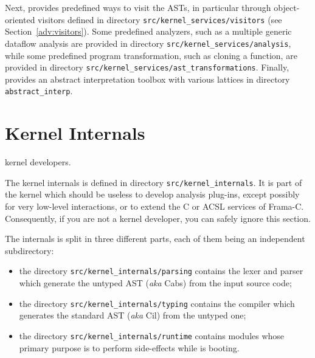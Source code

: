 Next, \framac provides predefined ways to visit the ASTs, in particular through
object-oriented visitors defined in directory
\texttt{src/kernel\_services/visitors} (see Section~\ref{adv:visitors}). 
Some predefined analyzers, such as a multiple generic dataflow analysis
are provided in directory \texttt{src/kernel\_services/analysis}, while some
predefined program transformation, such as cloning a function, are provided in
directory \texttt{src/kernel\_services/ast\_transformations}.
Finally, \framac provides an abstract interpretation 
toolbox
with various lattices in directory \texttt{abstract\_interp}.


\section{Kernel Internals}\label{archi:internals}

\begin{target}kernel developers.\end{target}

The kernel internals is defined in directory \texttt{src/kernel\_internals}. It
is part of the \framac kernel which should be useless to develop analysis
plug-ins, except possibly for very low-level interactions, or to extend the
C or ACSL services of Frama-C. Consequently, if you are not a kernel
developer, you can safely ignore this section.

The internals is split in three different parts, each of them being an
independent subdirectory:
\begin{itemize}
\item the directory \texttt{src/kernel\_internals/parsing} contains the lexer
  and parser which generate the untyped AST (\emph{aka} Cabs) from the \C input
  source code;
\item the directory \texttt{src/kernel\_internals/typing} contains the
  compiler which generates the standard AST (\emph{aka} Cil) from the untyped
  one;
\item the directory \texttt{src/kernel\_internals/runtime} contains modules
  whose primary purpose is to perform side-effects while \framac is booting.
\end{itemize}


